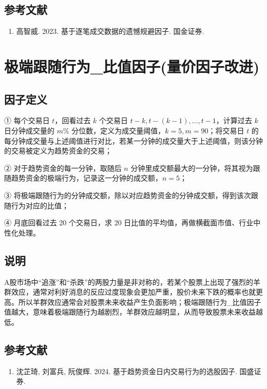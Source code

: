 \documentclass{article}
\begin{document}
\subsection{参考文献}
\begin{enumerate}
    \item 高智威. 2023. 基于逐笔成交数据的遗憾规避因子. 国金证券.
\end{enumerate}

\section{极端跟随行为\_比值因子(量价因子改进)}

\subsection{因子定义}
① 每个交易日 \( t \)，回看过去 \( k \) 个交易日 \( t-k, t-(k-1), \ldots, t-1 \)，计算过去 \( k \) 日分钟成交量的 \( m\% \) 分位数，定义为成交量阈值，\( k=5, m=90 \)；将交易日 \( t \) 的每分钟成交量与上述阈值进行对比，若某一分钟的成交量大于上述阈值，则该分钟的交易被定义为趋势资金的交易；

② 对于趋势资金的每一分钟，取随后 \( n \) 分钟里成交额最大的一分钟，将其视为跟随趋势资金的极端行为，记录这一分钟的成交额，\( n=5 \)；

③ 将极端跟随行为的分钟成交额，除以对应趋势资金的分钟成交额，得到该次跟随行为对应的比值；

④ 月底回看过去 20 个交易日，求 20 日比值的平均值，再做横截面市值、行业中性化处理。

\subsection{说明}
A股市场中“追涨”和“杀跌”的两股力量是非对称的，若某个股票上出现了强烈的羊群效应，通常对利好消息的反应过度现象会更加严重，股价未来下跌的概率也就更高。所以羊群效应通常会对股票未来收益产生负面影响；极端跟随行为\_比值因子值越大，意味着极端跟随行为越剧烈，羊群效应越明显，从而导致股票未来收益越低。

\subsection{参考文献}
\begin{enumerate}
    \item 沈芷琦, 刘富兵, 阮俊辉. 2024. 基于趋势资金日内交易行为的选股因子. 国盛证券.
\end{enumerate}
\end{document}
